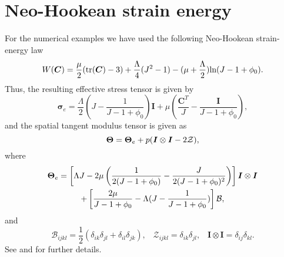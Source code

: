 
\section{Neo-Hookean strain energy}
\label{sec:neo_example}
For the numerical examples we have used the following Neo-Hookean strain-energy law
\begin{equation}
W(\boldsymbol{C})=\frac{\mu}{2}(\mbox{tr}(\boldsymbol{C})-3)+\frac{\Lambda}{4}(J^{2}-1)-(\mu+\frac{\Lambda}{2})\mbox{ln}(J-1+\phi_{0}).
\end{equation}
Thus, the resulting effective stress tensor is given by
\begin{equation}
\boldsymbol{\sigma}_{e}=\frac{\Lambda}{2}\left(J-\frac{1}{J-1+\phi_{0}}\right)\boldsymbol{I} + {\mu}\left(\frac{\boldsymbol{C}^{T}}{J} - \frac{\boldsymbol{I}}{J-1+\phi_{0}}\right),
\end{equation}
and the spatial tangent modulus tensor is given as
\begin{equation}
\boldsymbol{\Theta}=\boldsymbol{\Theta}_{e} + p ( \boldsymbol{I} \otimes \boldsymbol{I} - 2 \mathcal{Z}),
\end{equation} 
where
\begin{multline}
\boldsymbol{\Theta}_{e}=\left[\Lambda J-2\mu \left( \frac{1}{2(J-1+\phi_{0})} -\frac{J}{2(J-1+\phi_{0})^{2}} \right) \right]\boldsymbol{I}\otimes\boldsymbol{I}\\ + \left[\frac{2 \mu }{J-1+\phi_{0}} - \Lambda(J-\frac{1}{J-1+\phi_{0}} )  \right]\mathcal{B},
\end{multline}
and
\begin{equation}
\mathcal{B}_{ijkl}=\frac{1}{2}(\delta_{ik}\delta_{jl} + \delta_{il}\delta_{jk}), \;\;\;\mathcal{Z}_{ijkl}= \delta_{ik}\delta_{jl}, \;\;\; \boldsymbol{I} \otimes \boldsymbol{I}= \delta_{ij}\delta_{kl}.
\end{equation}
See \cite[chapter 5]{bonet1997nonlinear} and \cite[chapter 3]{wriggers2008nonlinear} for further details.


